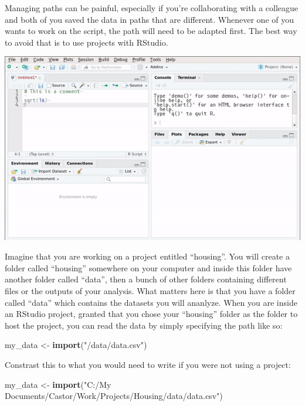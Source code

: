 \documentclass[]{gitbook}
\newenvironment{Shaded}{\begin{snugshade}}{\end{snugshade}}
\newcommand{\KeywordTok}[1]{\textcolor[rgb]{0.13,0.29,0.53}{\textbf{#1}}}
\newcommand{\NormalTok}[1]{#1}
\newcommand{\StringTok}[1]{\textcolor[rgb]{0.31,0.60,0.02}{#1}}
\begin{document}
Managing paths can be painful, especially if you're collaborating with a colleague and both of you
saved the data in paths that are different. Whenever one of you wants to work on the script, the
path will need to be adapted first. The best way to avoid that is to use projects with RStudio.

\includegraphics{pics/rstudio_projects.gif}

Imagine that you are working on a project entitled ``housing''. You will create a folder called
``housing'' somewhere on your computer and inside this folder have another folder called ``data'', then
a bunch of other folders containing different files or the outputs of your analysis. What matters
here is that you have a folder called ``data'' which contains the datasets you will ananlyze. When
you are inside an RStudio project, granted that you chose your ``housing'' folder as the folder to
host the project, you can read the data by simply specifying the path like so:

\begin{Shaded}
\begin{Highlighting}[]
\NormalTok{my_data <-}\StringTok{ }\KeywordTok{import}\NormalTok{(}\StringTok{"/data/data.csv"}\NormalTok{)}
\end{Highlighting}
\end{Shaded}

Constrast this to what you would need to write if you were not using a project:

\begin{Shaded}
\begin{Highlighting}[]
\NormalTok{my_data <-}\StringTok{ }\KeywordTok{import}\NormalTok{(}\StringTok{"C:/My Documents/Castor/Work/Projects/Housing/data/data.csv"}\NormalTok{)}
\end{Highlighting}
\end{Shaded}
\end{document}
